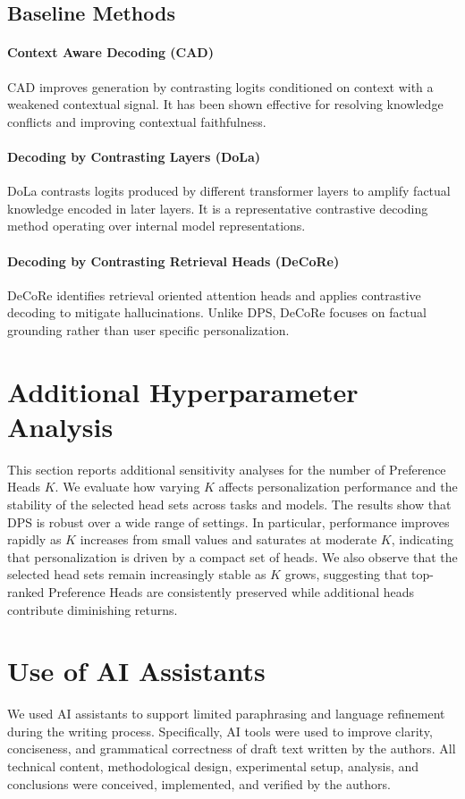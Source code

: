 \documentclass[11pt]{article}
\begin{document}
\subsection{Baseline Methods}

\paragraph{Context Aware Decoding (CAD)}
CAD improves generation by contrasting logits conditioned on context with a weakened contextual signal.
It has been shown effective for resolving knowledge conflicts and improving contextual faithfulness.

\paragraph{Decoding by Contrasting Layers (DoLa)}
DoLa contrasts logits produced by different transformer layers to amplify factual knowledge encoded in later layers.
It is a representative contrastive decoding method operating over internal model representations.

\paragraph{Decoding by Contrasting Retrieval Heads (DeCoRe)}
DeCoRe identifies retrieval oriented attention heads and applies contrastive decoding to mitigate hallucinations.
Unlike DPS, DeCoRe focuses on factual grounding rather than user specific personalization.






\section{Additional Hyperparameter Analysis}
\label{sec:appendix_hyperparam}


This section reports additional sensitivity analyses for the number of Preference Heads $K$.
We evaluate how varying $K$ affects personalization performance and the stability of the selected head sets across tasks and models.
The results show that DPS is robust over a wide range of settings.
In particular, performance improves rapidly as $K$ increases from small values and saturates at moderate $K$, indicating that personalization is driven by a compact set of heads.
We also observe that the selected head sets remain increasingly stable as $K$ grows, suggesting that top-ranked Preference Heads are consistently preserved while additional heads contribute diminishing returns.



\section{Use of AI Assistants}
\label{sec:appendix_ai_assistants}

We used AI assistants to support limited paraphrasing and language refinement during the writing process.
Specifically, AI tools were used to improve clarity, conciseness, and grammatical correctness of draft text written by the authors.
All technical content, methodological design, experimental setup, analysis, and conclusions were conceived, implemented, and verified by the authors.
\end{document}
